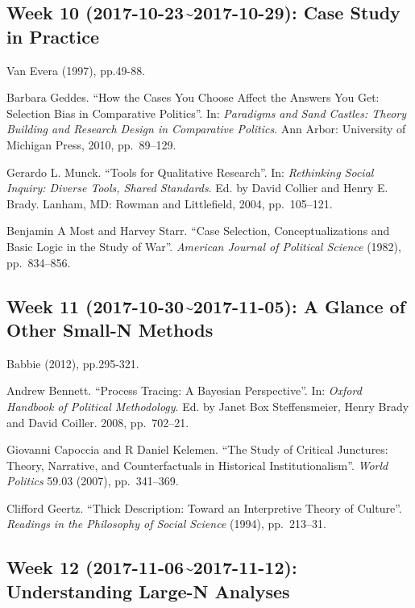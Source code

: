 \documentclass[11pt,]{article}
\begin{document}
\subsection{Week 10 (2017-10-23\textasciitilde{}2017-10-29): Case Study
in Practice}\label{week-10-2017-10-232017-10-29-case-study-in-practice}

Van Evera (1997), pp.49-88.

Barbara Geddes. ``How the Cases You Choose Affect the Answers You Get:
Selection Bias in Comparative Politics''. In:
\emph{Paradigms and Sand Castles: Theory Building and Research Design in Comparative Politics}.
Ann Arbor: University of Michigan Press, 2010, pp.~89--129.

Gerardo L. Munck. ``Tools for Qualitative Research''. In:
\emph{Rethinking Social Inquiry: Diverse Tools, Shared Standards}. Ed.
by David Collier and Henry E. Brady. Lanham, MD: Rowman and Littlefield,
2004, pp.~105--121.

Benjamin A Most and Harvey Starr. ``Case Selection, Conceptualizations
and Basic Logic in the Study of War''.
\emph{American Journal of Political Science} (1982), pp.~834--856.

\subsection{Week 11 (2017-10-30\textasciitilde{}2017-11-05): A Glance of
Other Small-N
Methods}\label{week-11-2017-10-302017-11-05-a-glance-of-other-small-n-methods}

Babbie (2012), pp.295-321.

Andrew Bennett. ``Process Tracing: A Bayesian Perspective''. In:
\emph{Oxford Handbook of Political Methodology}. Ed. by Janet Box
Steffensmeier, Henry Brady and David Coiller. 2008, pp.~702--21.

Giovanni Capoccia and R Daniel Kelemen. ``The Study of Critical
Junctures: Theory, Narrative, and Counterfactuals in Historical
Institutionalism''. \emph{World Politics} 59.03 (2007), pp.~341--369.

Clifford Geertz. ``Thick Description: Toward an Interpretive Theory of
Culture''. \emph{Readings in the Philosophy of Social Science} (1994),
pp.~213--31.

\subsection{Week 12 (2017-11-06\textasciitilde{}2017-11-12):
Understanding Large-N
Analyses}\label{week-12-2017-11-062017-11-12-understanding-large-n-analyses}
\end{document}
